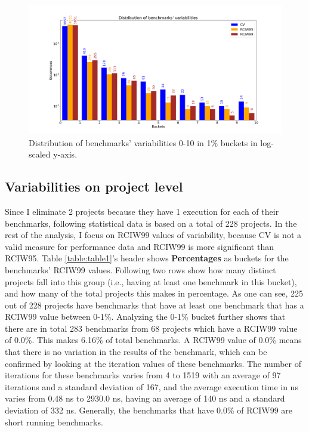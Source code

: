 \documentclass{seal_thesis}
\begin{document}
\begin{figure}[H]
	\centering
	\includegraphics[width=\linewidth]{resultsvis/log2}
	\caption{Distribution of benchmarks' variabilities 0-10 in 1\% buckets in log-scaled y-axis.}
	\label{fig:log2}
\end{figure}

\subsection{Variabilities on project level}

Since I eliminate 2 projects because they have 1 execution for each of their benchmarks, following statistical data is based on a total of 228 projects. In the rest of the analysis, I focus on RCIW99 values of variability, because CV is not a valid measure for performance data and RCIW99 is more significant than RCIW95. Table \ref{table:table1}'s header shows \textbf{Percentages} as buckets for the benchmarks' RCIW99 values. Following two rows show how many distinct projects fall into this group (i.e., having at least one benchmark in this bucket), and how many of the total projects this makes in percentage. As one can see, 225 out of 228 projects have benchmarks that have at least one benchmark that has a RCIW99 value between 0-1\%. Analyzing the 0-1\% bucket further shows that there are in total 283 benchmarks from 68 projects which have a RCIW99 value of 0.0\%. This makes 6.16\% of total benchmarks. A RCIW99 value of 0.0\% means that there is no variation in the results of the benchmark, which can be confirmed by looking at the iteration values of these benchmarks. The number of iterations for these benchmarks varies from 4 to 1519 with an average of 97 iterations and a standard deviation of 167, and the average execution time in ns varies from 0.48 ns to 2930.0 ns, having an average of 140 ns and a standard deviation of 332 ns. Generally, the benchmarks that have 0.0\% of RCIW99 are short running benchmarks.
\end{document}
